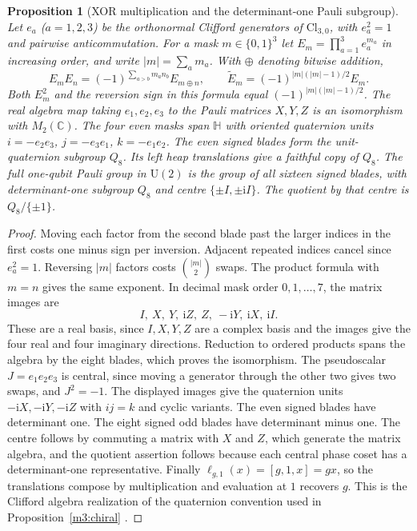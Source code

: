 \documentclass[11pt,reqno]{amsart}
\newtheorem{proposition}[theorem]{Proposition}
\theoremstyle{definition}
\theoremstyle{remark}
\numberwithin{equation}{section}
\newcommand{\C}{\mathbb{C}}
\newcommand{\HH}{\mathbb{H}}
\newcommand{\hp}[3]{[#1,#2,#3]}
\begin{document}
\begin{proposition}[XOR multiplication and the determinant-one Pauli subgroup]\label{m7:clifford}
Let $e_a$ ($a=1,2,3$) be the orthonormal Clifford generators of
$\mathrm{Cl}_{3,0}$, with $e_a^2=1$ and pairwise anticommutation.
For a mask $m\in\{0,1\}^3$ let $E_m=\prod_{a=1}^3 e_a^{m_a}$
in increasing order, and write $|m|=\sum_a m_a$.
With $\oplus$ denoting bitwise addition,
\[
 E_m E_n=(-1)^{\sum_{a>b}m_a n_b}E_{m\oplus n},
 \qquad \widetilde E_m=(-1)^{|m|(|m|-1)/2}E_m.
\]
Both $E_m^2$ and the reversion sign in this formula equal
$(-1)^{|m|(|m|-1)/2}$.
The real algebra map taking $e_1,e_2,e_3$ to the Pauli matrices
$X,Y,Z$ is an isomorphism with $M_2(\C)$. The four even masks span
$\HH$ with oriented quaternion units
$i=-e_2e_3$, $j=-e_3e_1$, $k=-e_1e_2$.
The even signed blades form the unit-quaternion subgroup $Q_8$. Its
left heap translations give a faithful copy of $Q_8$. The full one-qubit
Pauli group in $\mathrm U(2)$ is the group of all sixteen signed blades,
with determinant-one subgroup $Q_8$ and centre $\{\pm I,\pm\mathrm i I\}$.
The quotient by that centre is $Q_8/\{\pm1\}$.
\end{proposition}
\begin{proof}
Moving each factor from the second blade past the larger indices
in the first costs one minus sign per inversion. Adjacent repeated
indices cancel since $e_a^2=1$. Reversing $|m|$ factors costs
$\binom{|m|}{2}$ swaps. The product formula with $m=n$ gives the
same exponent. In decimal mask order $0,1,\ldots,7$, the matrix
images are
\[
 I,\ X,\ Y,\ \mathrm i Z,\ Z,\ -\mathrm iY,\ \mathrm iX,\ \mathrm iI .
\]
These are a real basis, since $I,X,Y,Z$ are a complex basis and the
images give the four real and four imaginary directions. Reduction
to ordered products spans the algebra by the eight blades, which
proves the isomorphism. The pseudoscalar $J=e_1e_2e_3$ is central,
since moving a generator through the other two gives two swaps,
and $J^2=-1$. The displayed images give the quaternion units
$-\mathrm iX,-\mathrm iY,-\mathrm iZ$ with $ij=k$ and cyclic variants.
The even signed blades have determinant one. The eight signed odd
blades have determinant minus one. The centre follows by commuting
a matrix with $X$ and $Z$, which generate the matrix algebra,
and the quotient assertion follows because each central phase
coset has a determinant-one representative. Finally
$\ell_{g,1}(x)=\hp g1x=gx$, so the translations compose by multiplication
and evaluation at $1$ recovers $g$. This is the Clifford algebra
realization of the quaternion convention used in
Proposition~\ref{m3:chiral} \cite[Chs.~3 and 16]{m7:Lounesto}.
\end{proof}
\end{document}
